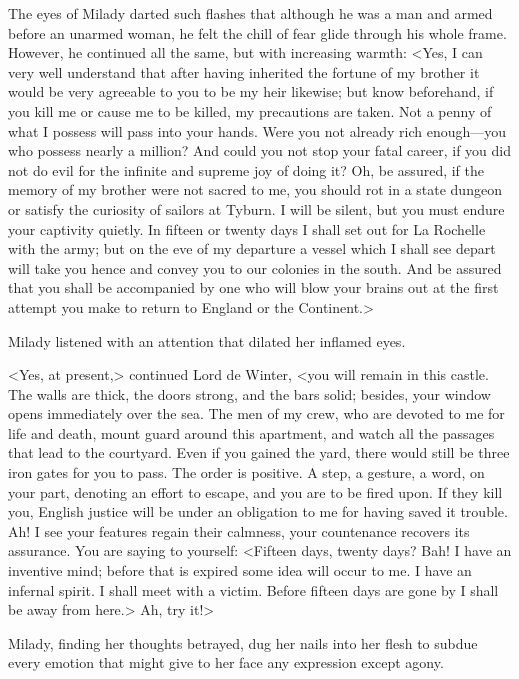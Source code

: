 The eyes of Milady darted such flashes that although he was a man and armed before an unarmed woman, he felt the chill of fear glide through his whole frame. However, he continued all the same, but with increasing warmth: <Yes, I can very well understand that after having inherited the fortune of my brother it would be very agreeable to you to be my heir likewise; but know beforehand, if you kill me or cause me to be killed, my precautions are taken. Not a penny of what I possess will pass into your hands. Were you not already rich enough—you who possess nearly a million? And could you not stop your fatal career, if you did not do evil for the infinite and supreme joy of doing it? Oh, be assured, if the memory of my brother were not sacred to me, you should rot in a state dungeon or satisfy the curiosity of sailors at Tyburn. I will be silent, but you must endure your captivity quietly. In fifteen or twenty days I shall set out for La Rochelle with the army; but on the eve of my departure a vessel which I shall see depart will take you hence and convey you to our colonies in the south. And be assured that you shall be accompanied by one who will blow your brains out at the first attempt you make to return to England or the Continent.> 

Milady listened with an attention that dilated her inflamed eyes. 

<Yes, at present,> continued Lord de Winter, <you will remain in this castle. The walls are thick, the doors strong, and the bars solid; besides, your window opens immediately over the sea. The men of my crew, who are devoted to me for life and death, mount guard around this apartment, and watch all the passages that lead to the courtyard. Even if you gained the yard, there would still be three iron gates for you to pass. The order is positive. A step, a gesture, a word, on your part, denoting an effort to escape, and you are to be fired upon. If they kill you, English justice will be under an obligation to me for having saved it trouble. Ah! I see your features regain their calmness, your countenance recovers its assurance. You are saying to yourself: <Fifteen days, twenty days? Bah! I have an inventive mind; before that is expired some idea will occur to me. I have an infernal spirit. I shall meet with a victim. Before fifteen days are gone by I shall be away from here.> Ah, try it!> 

Milady, finding her thoughts betrayed, dug her nails into her flesh to subdue every emotion that might give to her face any expression except agony. 

